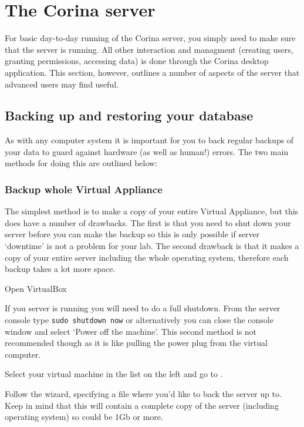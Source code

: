 
\chapter{The Corina server}
\label{txt:servermaintenance}

For basic day-to-day running of the Corina server, you simply need to make sure that the server is running.  All other interaction and managment (creating users, granting permissions, accessing data) is done through the Corina desktop application.  This section, however, outlines a number of aspects of the server that advanced users may find useful.

\section{Backing up and restoring your database}
As with any computer system it is important for you to back regular backups of your data to guard against hardware (as well as human!) errors. The two main methods for doing this are outlined below:

\subsection{Backup whole Virtual Appliance}
\label{txt:BackupVA}
The simplest method is to make a copy of your entire Virtual Appliance, but this does have a number of drawbacks.  The first is that you need to shut down your server before you can make the backup so this is only possible if server `downtime' is not a problem for your lab.  The second drawback is that it makes a copy of your entire server including the whole operating system, therefore each backup takes a lot more space.  

\begin{enumerate*}
 \item Open VirtualBox
 \item If you server is running you will need to do a full shutdown.  From the server console type \verb|sudo shutdown now| or alternatively you can close the console window and select `Power off the machine'.  This second method is not recommended though as it is like pulling the power plug from the virtual computer.
 \item Select your virtual machine in the list on the left and go to .
 \item Follow the wizard, specifying a file where you'd like to back the server up to.  Keep in mind that this will contain a complete copy of the server (including operating system) so could be 1Gb or more.
\end{enumerate*}

